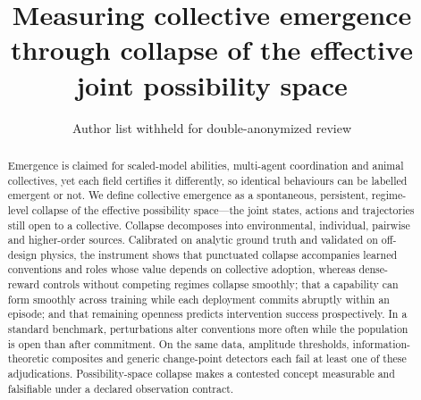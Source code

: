 \documentclass[11pt]{article}
\title{\vspace{-1.5em}\bfseries Measuring collective emergence through
collapse of the effective joint possibility space}
\author[ ]{Author list withheld for double-anonymized review}
\affil[ ]{Affiliations withheld}
\date{}
\begin{document}
\maketitle
\thispagestyle{empty}

\begin{abstract}
\noindent
Emergence is claimed for scaled-model abilities, multi-agent
coordination and animal collectives, yet each field certifies
it differently, so identical behaviours can be
labelled emergent or not. We define collective emergence as a spontaneous,
persistent, regime-level collapse of the effective possibility
space---the joint states, actions and trajectories still open to a
collective. Collapse decomposes into environmental, individual,
pairwise and higher-order sources. Calibrated on analytic ground truth and
validated on off-design physics, the instrument shows that punctuated
collapse accompanies learned conventions and roles whose value depends
on collective adoption, whereas dense-reward controls without
competing regimes collapse smoothly; that a capability can form
smoothly across training while each deployment commits abruptly within
an episode; and that remaining openness predicts intervention success
prospectively. In a standard benchmark, perturbations alter
conventions more often while the population is open than after
commitment. On the same data, amplitude thresholds,
information-theoretic composites and generic change-point detectors
each fail at least one of these adjudications. Possibility-space
collapse makes a contested concept
measurable and falsifiable under a declared observation contract.
\end{abstract}

\vspace{0.5em}
\end{document}
